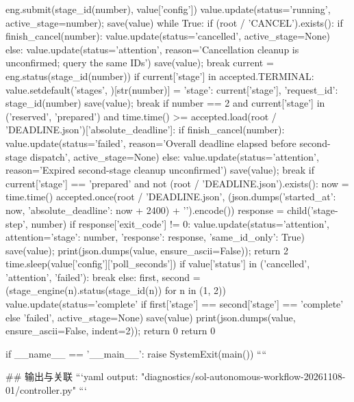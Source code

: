                 eng.submit(stage_id(number), value['config'])
                value.update(status='running', active_stage=number); save(value)
                while True:
                    if (root / 'CANCEL').exists():
                        if finish_cancel(number):
                            value.update(status='cancelled', active_stage=None)
                        else:
                            value.update(status='attention', reason='Cancellation cleanup is unconfirmed; query the same IDs')
                        save(value); break
                    current = eng.status(stage_id(number))
                    if current['stage'] in accepted.TERMINAL:
                        value.setdefault('stages', {})[str(number)] = {'stage': current['stage'], 'request_id': stage_id(number)}
                        save(value); break
                    if number == 2 and current['stage'] in ('reserved', 'prepared') and time.time() >= accepted.load(root / 'DEADLINE.json')['absolute_deadline']:
                        if finish_cancel(number):
                            value.update(status='failed', reason='Overall deadline elapsed before second-stage dispatch', active_stage=None)
                        else:
                            value.update(status='attention', reason='Expired second-stage cleanup unconfirmed')
                        save(value); break
                    if current['stage'] == 'prepared' and not (root / 'DEADLINE.json').exists():
                        now = time.time()
                        accepted.once(root / 'DEADLINE.json', (json.dumps({'started_at': now, 'absolute_deadline': now + 2400}) + '\n').encode())
                    response = child('stage-step', number)
                    if response['exit_code'] != 0:
                        value.update(status='attention', attention={'stage': number, 'response': response, 'same_id_only': True})
                        save(value); print(json.dumps(value, ensure_ascii=False)); return 2
                    time.sleep(value['config']['poll_seconds'])
                if value['status'] in ('cancelled', 'attention', 'failed'): break
            else:
                first, second = (stage_engine(n).status(stage_id(n)) for n in (1, 2))
                value.update(status='complete' if first['stage'] == second['stage'] == 'complete' else 'failed', active_stage=None)
                save(value)
            print(json.dumps(value, ensure_ascii=False, indent=2)); return 0
    return 0


if __name__ == '__main__':
    raise SystemExit(main())
````

## 输出与关联
```yaml
output: "diagnostics/sol-autonomous-workflow-20261108-01/controller.py"
```
